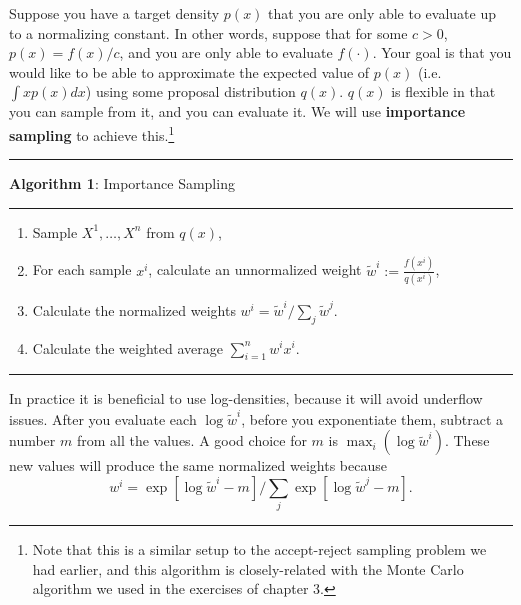 \documentclass[
  12pt,
  krantz2]{krantz}
\providecommand{\tightlist}{%
  \setlength{\itemsep}{0pt}\setlength{\parskip}{0pt}}
\begin{document}
Suppose you have a target density \(p(x)\) that you are only able to evaluate up to a normalizing constant. In other words, suppose that for some \(c > 0\), \(p(x) = f(x) / c\), and you are only able to evaluate \(f(\cdot)\). Your goal is that you would like to be able to approximate the expected value of \(p(x)\) (i.e.~\(\int x p(x) dx\)) using some proposal distribution \(q(x)\). \(q(x)\) is flexible in that you can sample from it, and you can evaluate it. We will use \textbf{importance sampling} \citep{impsamping1} \citep{impsamping2} to achieve this.\footnote{Note that this is a similar setup to the accept-reject sampling problem we had earlier, and this algorithm is closely-related with the Monte Carlo algorithm we used in the exercises of chapter 3.}

\begin{center}\rule{0.5\linewidth}{0.5pt}\end{center}

\textbf{Algorithm 1}: Importance Sampling

\begin{center}\rule{0.5\linewidth}{0.5pt}\end{center}

\begin{enumerate}
\def\labelenumi{\arabic{enumi}.}
\tightlist
\item
  Sample \(X^1, \ldots, X^n\) from \(q(x)\),
\item
  For each sample \(x^i\), calculate an unnormalized weight \(\tilde{w}^i:= \frac{f(x^i)}{q(x^i)}\),
\item
  Calculate the normalized weights \(w^i = \tilde{w}^i \bigg/ \sum_j \tilde{w}^j\).
\item
  Calculate the weighted average \(\sum_{i=1}^n w^i x^i\).
\end{enumerate}

\begin{center}\rule{0.5\linewidth}{0.5pt}\end{center}

In practice it is beneficial to use log-densities, because it will avoid underflow issues. After you evaluate each \(\log \tilde{w}^i\), before you exponentiate them, subtract a number \(m\) from all the values. A good choice for \(m\) is \(\max_i (\log \tilde{w}^i)\). These new values will produce the same normalized weights because
\[
w^i = \exp[ \log \tilde{w}^i - m] \bigg/ \sum_j \exp[\log \tilde{w}^j - m].
\]
\end{document}
